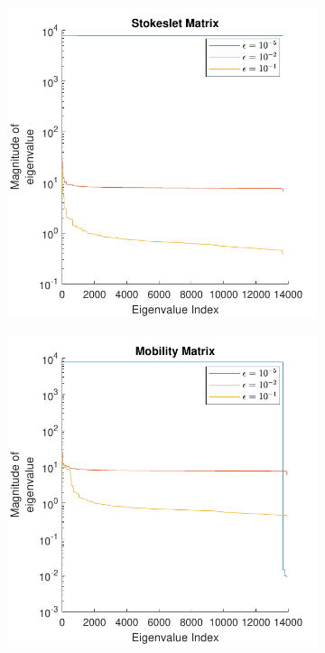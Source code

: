 \begin{figure}
\caption[Eigenvalues of matrices considered in this paper.]{Eigenvalues of matrices considered in this paper for the case of 40 swimmers and 114 force quadrature points.}
    \begin{subfigure}{0.45\textwidth}
        \centering
        \includegraphics[width=\linewidth]{Images/Condition/Eigen-Stokeslet Matrix.pdf}
    \end{subfigure}
    \hfill
    \begin{subfigure}{0.45\textwidth}
        \centering
        \includegraphics[width=\linewidth]{Images/Condition/Eigen-Mobility Matrix.pdf}
    \end{subfigure}
\end{figure}
